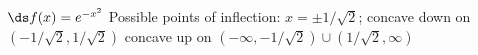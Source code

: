 {$\ds f(x) = e^{-x^2}$\label{exer:03_04_ex_28}
}
{Possible points of inflection: $x=\pm 1/\sqrt{2}$;
concave down on $(- 1/\sqrt{2}, 1/\sqrt{2})$
concave up on $(-\infty,- 1/\sqrt{2})\cup( 1/\sqrt{2},\infty)$
}
